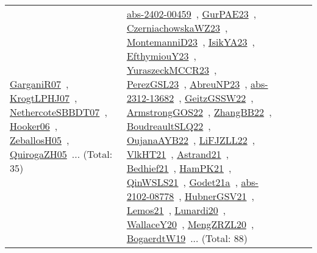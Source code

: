 {\begin{longtable}{lp{3cm}>{\raggedright\arraybackslash}p{6cm}>{\raggedright\arraybackslash}p{6cm}>{\raggedright\arraybackslash}p{8cm}}
\href{works/GarganiR07.pdf}{GarganiR07}~\cite{GarganiR07}, \href{works/KrogtLPHJ07.pdf}{KrogtLPHJ07}~\cite{KrogtLPHJ07}, \href{works/NethercoteSBBDT07.pdf}{NethercoteSBBDT07}~\cite{NethercoteSBBDT07}, \href{works/Hooker06.pdf}{Hooker06}~\cite{Hooker06}, \href{works/ZeballosH05.pdf}{ZeballosH05}~\cite{ZeballosH05}, \href{works/QuirogaZH05.pdf}{QuirogaZH05}~\cite{QuirogaZH05}... (Total: 35) & \href{works/abs-2402-00459.pdf}{abs-2402-00459}~\cite{abs-2402-00459}, \href{works/GurPAE23.pdf}{GurPAE23}~\cite{GurPAE23}, \href{works/CzerniachowskaWZ23.pdf}{CzerniachowskaWZ23}~\cite{CzerniachowskaWZ23}, \href{works/MontemanniD23.pdf}{MontemanniD23}~\cite{MontemanniD23}, \href{works/IsikYA23.pdf}{IsikYA23}~\cite{IsikYA23}, \href{works/EfthymiouY23.pdf}{EfthymiouY23}~\cite{EfthymiouY23}, \href{works/YuraszeckMCCR23.pdf}{YuraszeckMCCR23}~\cite{YuraszeckMCCR23}, \href{works/PerezGSL23.pdf}{PerezGSL23}~\cite{PerezGSL23}, \href{works/AbreuNP23.pdf}{AbreuNP23}~\cite{AbreuNP23}, \href{works/abs-2312-13682.pdf}{abs-2312-13682}~\cite{abs-2312-13682}, \href{works/GeitzGSSW22.pdf}{GeitzGSSW22}~\cite{GeitzGSSW22}, \href{works/ArmstrongGOS22.pdf}{ArmstrongGOS22}~\cite{ArmstrongGOS22}, \href{works/ZhangBB22.pdf}{ZhangBB22}~\cite{ZhangBB22}, \href{works/BoudreaultSLQ22.pdf}{BoudreaultSLQ22}~\cite{BoudreaultSLQ22}, \href{works/OujanaAYB22.pdf}{OujanaAYB22}~\cite{OujanaAYB22}, \href{works/LiFJZLL22.pdf}{LiFJZLL22}~\cite{LiFJZLL22}, \href{works/VlkHT21.pdf}{VlkHT21}~\cite{VlkHT21}, \href{works/Astrand21.pdf}{Astrand21}~\cite{Astrand21}, \href{works/Bedhief21.pdf}{Bedhief21}~\cite{Bedhief21}, \href{works/HamPK21.pdf}{HamPK21}~\cite{HamPK21}, \href{works/QinWSLS21.pdf}{QinWSLS21}~\cite{QinWSLS21}, \href{works/Godet21a.pdf}{Godet21a}~\cite{Godet21a}, \href{works/abs-2102-08778.pdf}{abs-2102-08778}~\cite{abs-2102-08778}, \href{works/HubnerGSV21.pdf}{HubnerGSV21}~\cite{HubnerGSV21}, \href{works/Lemos21.pdf}{Lemos21}~\cite{Lemos21}, \href{works/Lunardi20.pdf}{Lunardi20}~\cite{Lunardi20}, \href{works/WallaceY20.pdf}{WallaceY20}~\cite{WallaceY20}, \href{works/MengZRZL20.pdf}{MengZRZL20}~\cite{MengZRZL20}, \href{works/BogaerdtW19.pdf}{BogaerdtW19}~\cite{BogaerdtW19}... (Total: 88)\\

\end{longtable}}

